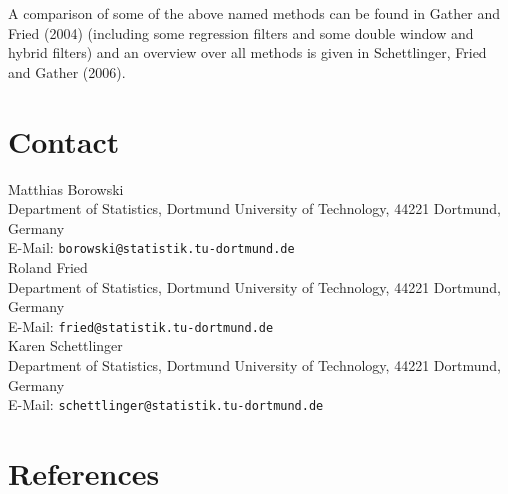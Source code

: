 \documentclass[a4paper]{scrartcl}
\begin{document}
\vspace{1.5cm}
\noindent
A comparison of some of the above named methods can be found in
Gather and Fried (2004) (including some regression filters and
some double window and hybrid filters) and an overview over all
methods is given in Schettlinger, Fried and Gather (2006).

\section{Contact}


Matthias Borowski\\
Department of Statistics, Dortmund University of Technology, 44221 Dortmund, Germany\\
E-Mail: \texttt{borowski@statistik.tu-dortmund.de}\vspace*{0.5cm}\\
Roland Fried\\
Department of Statistics, Dortmund University of Technology, 44221 Dortmund, Germany\\
E-Mail: \texttt{fried@statistik.tu-dortmund.de}\vspace*{0.5cm}\\
Karen Schettlinger\\
Department of Statistics, Dortmund University of Technology, 44221 Dortmund, Germany\\
E-Mail: \texttt{schettlinger@statistik.tu-dortmund.de}

\section{References}
\end{document}
